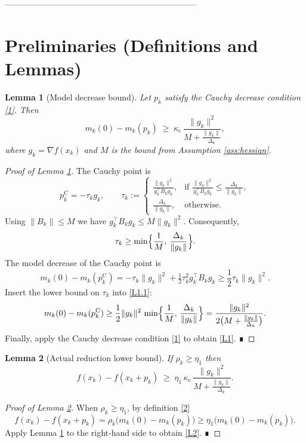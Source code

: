 \documentclass{article}
\newtheorem{lemma}{Lemma}
\begin{document}
---------------------------------------------------------------------

\newpage
\section*{Preliminaries (Definitions and Lemmas)}
\begin{lemma}[Model decrease bound]\label{lem:model-decrease}
Let \(p_{k}\) satisfy the Cauchy decrease condition \eqref{1}. Then
\[
m_{k}(0)-m_{k}(p_{k})\;\ge\;\kappa_{\mathrm{c}}\,
\frac{\|g_{k}\|^{2}}{M+\frac{\|g_{k}\|}{\Delta_{k}}},
\tag{L1}
\]
where \(g_{k}=\nabla f(x_{k})\) and \(M\) is the bound from
Assumption \ref{ass:hessian}.
\end{lemma}
\begin{proof}[Proof of Lemma \ref{lem:model-decrease}]
The Cauchy point is
\[
p^{\mathrm{C}}_{k}= -\tau_{k} g_{k},\qquad
\tau_{k}:=
\begin{cases}
\displaystyle\frac{\|g_{k}\|^{2}}{g_{k}^{\top}B_{k}g_{k}}, &\text{if }
\frac{\|g_{k}\|^{2}}{g_{k}^{\top}B_{k}g_{k}}\le\frac{\Delta_{k}}{\|g_{k}\|},\\[6pt]
\displaystyle\frac{\Delta_{k}}{\|g_{k}\|}, &\text{otherwise}.
\end{cases}
\]
Using \(\|B_{k}\|\le M\) we have
\(g_{k}^{\top}B_{k}g_{k}\le M\|g_{k}\|^{2}\). Consequently,
\[
\tau_{k}\ge\min\Bigl\{\frac{1}{M},\,\frac{\Delta_{k}}{\|g_{k}\|}\Bigr\}.
\]
The model decrease of the Cauchy point is
\[
m_{k}(0)-m_{k}(p^{\mathrm{C}}_{k})
= -\tau_{k}\|g_{k}\|^{2}+\tfrac12\tau_{k}^{2}g_{k}^{\top}B_{k}g_{k}
\ge \frac12\tau_{k}\|g_{k}\|^{2}.
\tag{L1.1}
\]
Insert the lower bound on \(\tau_{k}\) into \eqref{L1.1}:
\[
m_{k}(0)-m_{k}(p^{\mathrm{C}}_{k})
\ge\frac12\|g_{k}\|^{2}\,
\min\Bigl\{\frac{1}{M},\,\frac{\Delta_{k}}{\|g_{k}\|}\Bigr\}
= \frac{\|g_{k}\|^{2}}{2\bigl(M+\frac{\|g_{k}\|}{\Delta_{k}}\bigr)} .
\]
Finally, apply the Cauchy decrease condition \eqref{1} to obtain
\eqref{L1}. ∎
\end{proof}

\begin{lemma}[Actual reduction lower bound]\label{lem:actual-reduction}
If \(\rho_{k}\ge\eta_{1}\) then
\[
f(x_{k})-f(x_{k}+p_{k})\;\ge\;
\eta_{1}\,\kappa_{\mathrm{c}}\,
\frac{\|g_{k}\|^{2}}{M+\frac{\|g_{k}\|}{\Delta_{k}}}.
\tag{L2}
\]
\end{lemma}
\begin{proof}[Proof of Lemma \ref{lem:actual-reduction}]
When \(\rho_{k}\ge\eta_{1}\), by definition \eqref{2}
\[
f(x_{k})-f(x_{k}+p_{k})
=\rho_{k}\bigl(m_{k}(0)-m_{k}(p_{k})\bigr)
\ge\eta_{1}\bigl(m_{k}(0)-m_{k}(p_{k})\bigr).
\]
Apply Lemma \ref{lem:model-decrease} to the right‑hand side to obtain
\eqref{L2}. ∎
\end{proof}
\end{document}
